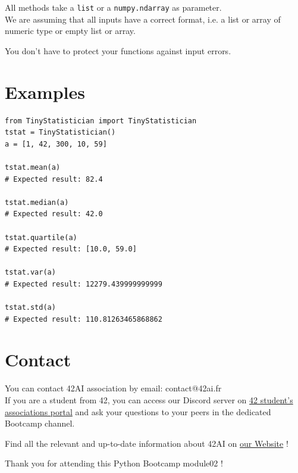 \documentclass{42-en}
\begin{document}
All methods take a \texttt{list} or a \texttt{numpy.ndarray} as parameter.\\

We are assuming that all inputs have a correct format, i.e. a list or array of numeric type or empty list or array.

You don't have to protect your functions against input errors.

\section*{Examples}
\begin{verbatim}
from TinyStatistician import TinyStatistician
tstat = TinyStatistician()
a = [1, 42, 300, 10, 59]

tstat.mean(a)
# Expected result: 82.4

tstat.median(a)
# Expected result: 42.0

tstat.quartile(a)
# Expected result: [10.0, 59.0]

tstat.var(a)
# Expected result: 12279.439999999999

tstat.std(a)
# Expected result: 110.81263465868862  
\end{verbatim}




\newpage

\section*{Contact}
You can contact 42AI association by email: contact@42ai.fr\\

If you are a student from 42, you can access our Discord server 
on \href{https://discord.com/channels/887850395697807362/887850396314398720}{42 student's associations portal} and ask your
questions to your peers in the dedicated Bootcamp channel. 

Find all the relevant and up-to-date information about 42AI on \href{https://42-ai.github.io}{our Website} ! 

Thank you for attending this Python Bootcamp module02 !
\end{document}
